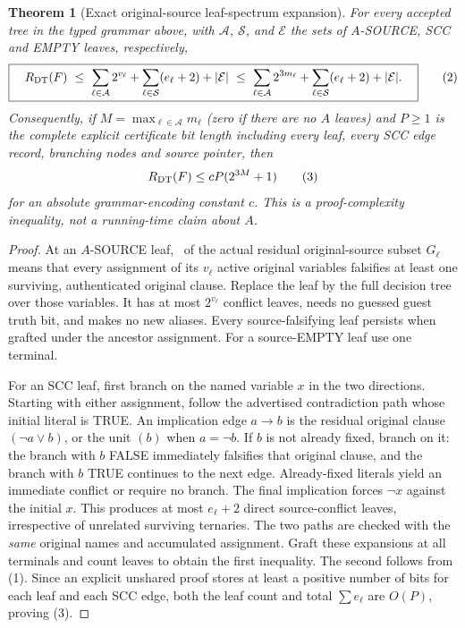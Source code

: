 \documentclass[11pt]{article}
\newtheorem{theorem}{Theorem}
\newcommand{\UNSAT}{\mathsf{UNSAT}}
\begin{document}
\begin{theorem}[Exact original-source leaf-spectrum expansion]\label{th:spectrum}
For every accepted tree in the typed grammar above, with $\mathcal A$, $\mathcal S$, and $\mathcal E$ the sets of $A$-SOURCE, SCC and EMPTY leaves, respectively,
\[
\boxed{\quad
R_{\rm DT}(F)\ \le\
\sum_{\ell\in\mathcal A}2^{v_\ell}
+\sum_{\ell\in\mathcal S}(e_\ell+2)
+|\mathcal E|
\ \le\
\sum_{\ell\in\mathcal A}2^{3m_\ell}
+\sum_{\ell\in\mathcal S}(e_\ell+2)+|\mathcal E| .\quad}
\tag{2}
\]
Consequently, if $M=\max_{\ell\in\mathcal A}m_\ell$ (zero if there are no $A$ leaves) and $P\ge1$ is the complete explicit certificate bit length including every leaf, every SCC edge record, branching nodes and source pointer, then
\[
                       R_{\rm DT}(F)\le cP(2^{3M}+1)
\tag{3}
\]
for an absolute grammar-encoding constant $c$. This is a \emph{proof-complexity inequality}, not a running-time claim about $A$.
\end{theorem}
\begin{proof}
At an $A$-SOURCE leaf, \UNSAT\ of the actual residual original-source subset $G_\ell$ means that every assignment of its $v_\ell$ active original variables falsifies at least one surviving, authenticated original clause. Replace the leaf by the full decision tree over those variables. It has at most $2^{v_\ell}$ conflict leaves, needs no guessed guest truth bit, and makes no new aliases. Every source-falsifying leaf persists when grafted under the ancestor assignment. For a source-EMPTY leaf use one terminal.

For an SCC leaf, first branch on the named variable $x$ in the two directions. Starting with either assignment, follow the advertised contradiction path whose initial literal is TRUE. An implication edge $a\to b$ is the residual original clause $(\neg a\vee b)$, or the unit $(b)$ when $a=\neg b$. If $b$ is not already fixed, branch on it: the branch with $b$ FALSE immediately falsifies that original clause, and the branch with $b$ TRUE continues to the next edge. Already-fixed literals yield an immediate conflict or require no branch. The final implication forces $\neg x$ against the initial $x$. This produces at most $e_\ell+2$ direct source-conflict leaves, irrespective of unrelated surviving ternaries. The two paths are checked with the \emph{same} original names and accumulated assignment. Graft these expansions at all terminals and count leaves to obtain the first inequality. The second follows from (1). Since an explicit unshared proof stores at least a positive number of bits for each leaf and each SCC edge, both the leaf count and total $\sum e_\ell$ are $O(P)$, proving (3).
\end{proof}
\end{document}
